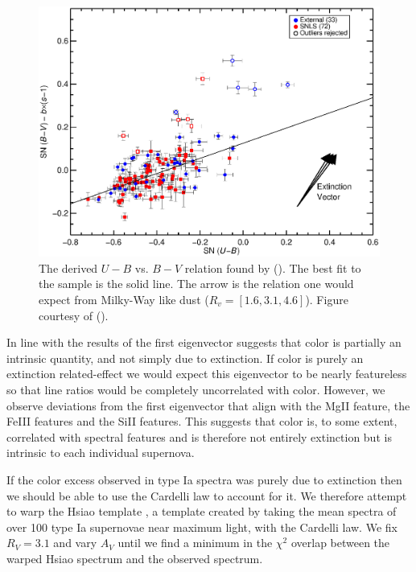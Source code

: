 \begin{figure}[ht]
\begin{center}
\includegraphics[angle=0,scale=0.8]{./figures/conley/f10_color.eps}
\end{center}
\caption{
The derived $U - B$ vs. $B - V$ relation found by \citeauthor{conley08a} (\citeyear{conley08a}). The best fit to the sample is the solid line. The arrow is the relation one would expect from Milky-Way like dust ($R_{v} = [1.6,3.1,4.6]$). Figure courtesy of \citeauthor{conley08a} (\citeyear{conley08a}).
}
\label{fig:conleyfigure}
\end{figure}

In line with the results of \citeauthor{conley08a} the first eigenvector suggests that color is partially an intrinsic quantity, and not simply due to extinction. If color is purely an extinction related-effect we would expect this eigenvector to be nearly featureless so that line ratios would be completely uncorrelated with color. However, we observe deviations from the first eigenvector that align with the MgII feature, the FeIII features and the SiII features. This suggests that color is, to some extent, correlated with spectral features and is therefore not entirely extinction but is intrinsic to each individual supernova. 

If the color excess observed in type Ia spectra was purely due to extinction then we should be able to use the Cardelli law \citep{cardelli89a} to account for it. We therefore attempt to warp the Hsiao template \citep{hsiao07a}, a template created by taking the mean spectra of over 100 type Ia supernovae near maximum light, with the Cardelli law. We fix $ R_{V} =3.1$ and vary $A_{V}$ until we find a minimum in the $\chi^{2}$ overlap between the warped Hsiao spectrum and the observed spectrum.


